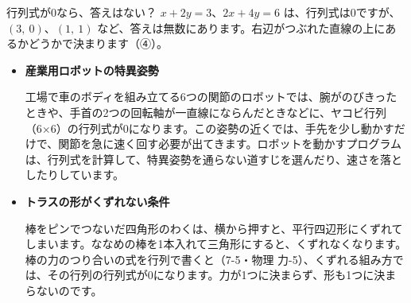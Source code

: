 \begin{tsumazuki}{行列式が0なら、答えはない？}
$x+2y=3$、$2x+4y=6$ は、行列式は0ですが、$(3,\ 0)$、$(1,\ 1)$ など、答えは無数にあります。右辺がつぶれた直線の上にあるかどうかで決まります（④）。
\end{tsumazuki}

\begin{butsuri}
\begin{itemize}[leftmargin=1.2\zw, itemsep=3pt, topsep=0pt, label={\color{bkPurple}●}]
\item \textbf{産業用ロボットの特異姿勢}\par\noindent\begin{minipage}[c]{0.70\linewidth}
工場で車のボディを組み立てる6つの関節のロボットでは、腕がのびきったときや、手首の2つの回転軸が一直線にならんだときなどに、ヤコビ行列（6×6）の行列式が0になります。この姿勢の近くでは、手先を少し動かすだけで、関節を急に速く回す必要が出てきます。ロボットを動かすプログラムは、行列式を計算して、特異姿勢を通らない道すじを選んだり、速さを落としたりしています。
\end{minipage}\hfill
\begin{minipage}[c]{0.27\linewidth}\centering
{}
\end{minipage}
\item \textbf{トラスの形がくずれない条件}\par\noindent\begin{minipage}[c]{0.70\linewidth}
棒をピンでつないだ四角形のわくは、横から押すと、平行四辺形にくずれてしまいます。ななめの棒を1本入れて三角形にすると、くずれなくなります。棒の力のつり合いの式を行列で書くと（7-5・物理 力-5）、くずれる組み方では、その行列の行列式が0になります。力が1つに決まらず、形も1つに決まらないのです。
\end{minipage}\hfill
\begin{minipage}[c]{0.27\linewidth}\centering
\begin{tikzpicture}[x=0.8mm, y=0.8mm]

\end{tikzpicture}
\end{minipage}
\end{itemize}
\end{butsuri}

